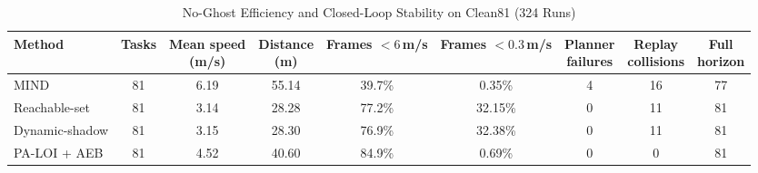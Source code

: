\begin{table}[t]
\caption{No-Ghost Efficiency and Closed-Loop Stability on Clean81 (324 Runs)}
\label{tab:noghost-efficiency}
\centering
\scriptsize
\setlength{\tabcolsep}{6pt}
\begin{tabular}{lcccccccc}
\toprule
Method & Tasks & \makecell{Mean speed\\(m/s)} & \makecell{Distance\\(m)} & \makecell{Frames\\$<6$\,m/s} & \makecell{Frames\\$<0.3$\,m/s} & \makecell{Planner\\failures} & \makecell{Replay\\collisions} & \makecell{Full\\horizon} \\
\midrule
MIND & 81 & 6.19 & 55.14 & 39.7\% & 0.35\% & 4 & 16 & 77 \\
Reachable-set & 81 & 3.14 & 28.28 & 77.2\% & 32.15\% & 0 & 11 & 81 \\
Dynamic-shadow & 81 & 3.15 & 28.30 & 76.9\% & 32.38\% & 0 & 11 & 81 \\
PA-LOI + AEB & 81 & 4.52 & 40.60 & 84.9\% & 0.69\% & 0 & 0 & 81 \\
\bottomrule
\end{tabular}

\vspace{3pt}{\scriptsize Speed loss relative to MIND: PA-LOI 27.0\%, Reachable-set 49.2\%, Dynamic-shadow 49.2\%.}
\end{table}
